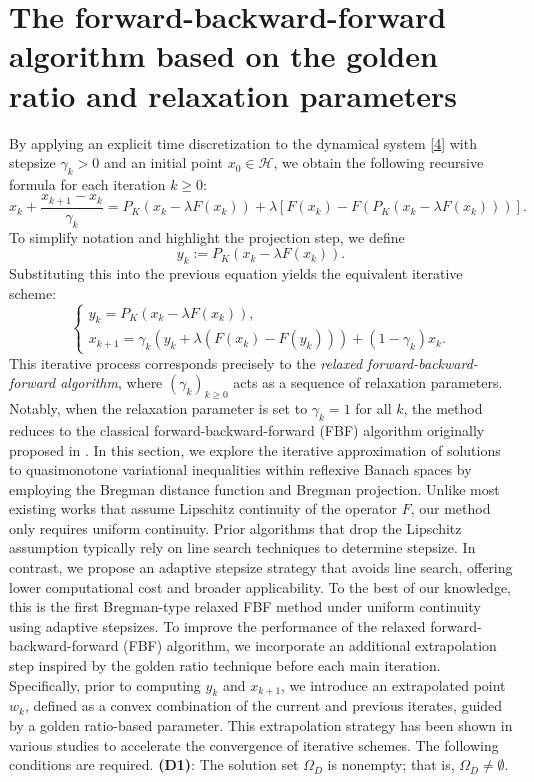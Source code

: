 \documentclass[hidelinks,11 pt]{article}
\numberwithin{equation}{section}
\theoremstyle{definition}  %
\numberwithin{equation}{section}
\numberwithin{theorem}{section}
\begin{document}
\section{The forward-backward-forward algorithm based on the golden ratio and relaxation parameters}\label{sec:algorithm}
\quad\quad By applying an explicit time discretization to the dynamical system \eqref{4} with stepsize $\gamma_k > 0$ and an initial point $x_0 \in \mathcal{H}$, we obtain the following recursive formula for each iteration $k \geq 0$:
\[
x_k + \frac{x_{k+1} - x_k}{\gamma_k} = P_K(x_k - \lambda F(x_k)) + \lambda \left[ F(x_k) - F\left(P_K(x_k - \lambda F(x_k))\right) \right].
\]
To simplify notation and highlight the projection step, we define
\[
y_k := P_K(x_k - \lambda F(x_k)).
\]
Substituting this into the previous equation yields the equivalent iterative scheme:
\[
\begin{cases}
y_k = P_K(x_k - \lambda F(x_k)), \\
x_{k+1} = \gamma_k \left( y_k + \lambda (F(x_k) - F(y_k)) \right) + (1 - \gamma_k) x_k.
\end{cases}
\]
This iterative process corresponds precisely to the \emph{relaxed forward-backward-forward algorithm}, where $(\gamma_k)_{k \geq 0}$ acts as a sequence of relaxation parameters. Notably, when the relaxation parameter is set to $\gamma_k = 1$ for all $k$, the method reduces to the classical forward-backward-forward (FBF) algorithm originally proposed in \cite{a13}. 
\vskip 2mm 
In this section, we explore the iterative approximation of solutions to quasimonotone variational inequalities within reflexive Banach spaces by employing the Bregman distance function and Bregman projection. Unlike most existing works that assume Lipschitz continuity of the operator \(F\), our method only requires uniform continuity. Prior algorithms that drop the Lipschitz assumption typically rely on line search techniques to determine stepsize. In contrast, we propose an adaptive stepsize strategy that avoids line search, offering lower computational cost and broader applicability. To the best of our knowledge, this is the first Bregman-type relaxed FBF method under uniform continuity using adaptive stepsizes.
\vskip 2mm 
To improve the performance of the relaxed forward-backward-forward (FBF) algorithm, we incorporate an additional extrapolation step inspired by the golden ratio technique before each main iteration. Specifically, prior to computing $y_k$ and $x_{k+1}$, we introduce an extrapolated point $w_k$, defined as a convex combination of the current and previous iterates, guided by a golden ratio-based parameter. This extrapolation strategy has been shown in various studies to accelerate the convergence of iterative schemes.
\vskip 2mm 
The following conditions are required. 
\vskip 2mm 
\textbf{(D1)}: The solution set \( \Omega_{D} \) is nonempty; that is, \( \Omega_{D} \neq \emptyset \).
\end{document}
